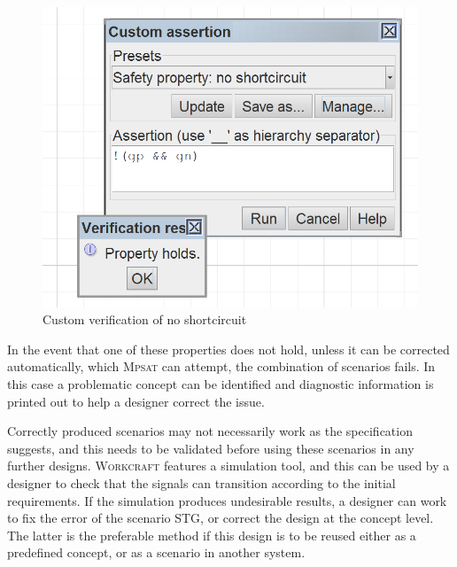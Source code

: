 \documentclass[british,compsoc]{IEEEtran}
\newcommand{\noun}[1]{\textsc{#1}}
\begin{document}
\begin{figure}[h]
\begin{centering}
\includegraphics[scale=0.75]{Images/screenshot-custom-assertion}
\par\end{centering}

\begin{centering}
\protect\caption{\label{fig:buck STG}Custom verification of no shortcircuit}

\par\end{centering}

\end{figure}

In the event that one of these properties does not hold, unless it
can be corrected automatically, which \noun{Mpsat} can attempt, the combination of scenarios fails.
In this case a problematic concept can be identified and diagnostic information
is printed out to help a designer correct the issue.

Correctly produced scenarios may not necessarily work as the specification
suggests, and this needs to be validated before using these scenarios
in any further designs. \noun{Workcraft} features a simulation tool,
and this can be used by a designer to check that the signals can transition
according to the initial requirements. If the simulation produces
undesirable results, a designer can work to fix the error of the scenario
STG, or correct the design at the concept level. The latter is the
preferable method if this design is to be reused either as a predefined
concept, or as a scenario in another system.
\end{document}
